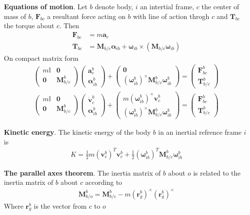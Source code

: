 \textbf{Equations of motion}. Let \(b\) denote body, \(i\) an intertial frame, \(c\) the center of mass of \(b\), \(\bm{F}_{bc}\) a resultant force acting on \(b\) with line of action throgh \(c\) and \(\bm{T}_{bc}\) the torque about \(c\). Then
\begin{align*}
    \bm{F}_{bc} &= m\bm{a}_c \\
    \bm{T}_{bc} &= \bm{M}_{b/c}\bm{\alpha}_{ib} + \bm{\omega}_{ib}\times(\bm{M}_{b/c}\bm{\omega}_{ib})
\end{align*}
On compact matrix form
\begin{align*}
    \begin{pmatrix} m\mathbb{I} & \bm{0} \\ \bm{0} & \bm{M}_{b/c}^b \end{pmatrix}
        \begin{pmatrix}\bm{a}_c^b \\ \bm{\alpha}_{ib}^b \end{pmatrix} + 
        \begin{pmatrix} \bm{0} \\ (\bm{\omega}_{ib}^b)^\times\bm{M}_{b/c}^b\bm{\omega}_{ib}^b\end{pmatrix} =
            \begin{pmatrix}\bm{F}_{bc}^b \\ \bm{T}_{b/c}^b\end{pmatrix} \\
    \begin{pmatrix} m\mathbb{I} & \bm{0} \\ \bm{0} & \bm{M}_{b/c}^b \end{pmatrix}
        \begin{pmatrix}\dot{\bm{v}}_c^b \\ \bm{\alpha}_{ib}^b \end{pmatrix} + 
            \begin{pmatrix} m(\bm{\omega}_{ib}^b)^\times\bm{v}_c^b \\ (\bm{\omega}_{ib}^b)^\times\bm{M}_{b/c}^b\bm{\omega}_{ib}^b\end{pmatrix} =
            \begin{pmatrix}\bm{F}_{bc}^b \\ \bm{T}_{b/c}^b\end{pmatrix}
\end{align*}

\textbf{Kinetic energy}. The kinetic energy of the body \(b\) in an inertial refrence frame \(i\) is
\begin{align*}
    K = \frac{1}{2}m(\bm{v}_c^b)^T\bm{v}_c^b + \frac{1}{2}(\bm{\omega}_{ib}^b)^T\bm{M}_{b/c}^b\bm{\omega}_{ib}^b
\end{align*}

\textbf{The parallel axes theorem}. The inertia matrix of \(b\) about \(o\) is related to the inertia matrix of \(b\) about \(c\) according to
\begin{align*}
    \bm{M}_{b/o}^b = \bm{M}_{b/c}^b-m(\bm{r}_g^b)^\times(\bm{r}_g^b)^\times
\end{align*}
Where \(\bm{r}_g^b\) is the vector from \(c\) to \(o\)
